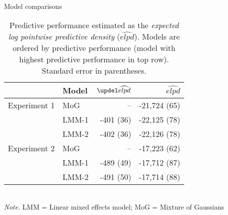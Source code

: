 \begin{frame}{Model comparisons}
\begin{scriptsize}
\begin{table}[ht]
\centering
	\caption{\scriptsize{Predictive performance estimated as the \textit{expected log pointwise predictive density} ($\widehat{elpd}$). Models are ordered by predictive performance (model with highest predictive performance in top row)}. Standard error in parentheses.}
\begin{tabular}{rlrr}
  \toprule
 & Model & $\updel\widehat{elpd}$ & $\widehat{elpd}$ \\ 
  \midrule
 Experiment 1 & MoG & -- & -21,724 (65) \\ 
  & LMM-1 & -401 (36) & -22,125 (78) \\ 
  & LMM-2 & -402 (36) & -22,126 (78) \\ 
   \midrule
    Experiment 2 & MoG & -- & -17,223 (62) \\ 
   & LMM-1 & -489 (49) & -17,712 (87) \\ 
    & LMM-2 & -491 (50) & -17,714 (88) \\ 

		\bottomrule
		\end{tabular}\\
		\textit{Note.} LMM = Linear mixed effects model; MoG = Mixture of Gaussians
		 
		\end{table}
\end{scriptsize}
\end{frame}